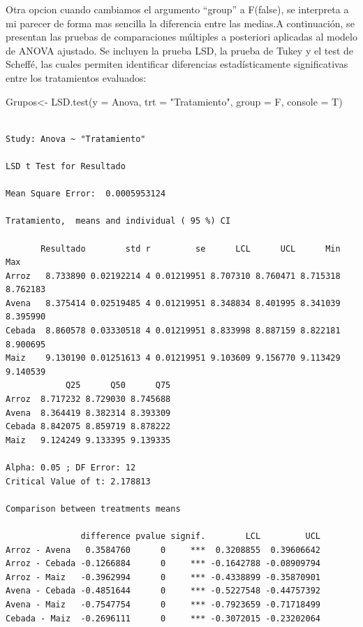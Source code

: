 \documentclass[
  spanish,
  letterpaper,
  DIV=11,
  numbers=noendperiod]{scrreprt}
\newenvironment{Shaded}{\begin{snugshade}}{\end{snugshade}}
\newcommand{\AttributeTok}[1]{\textcolor[rgb]{0.40,0.45,0.13}{#1}}
\newcommand{\FunctionTok}[1]{\textcolor[rgb]{0.28,0.35,0.67}{#1}}
\newcommand{\NormalTok}[1]{\textcolor[rgb]{0.00,0.23,0.31}{#1}}
\newcommand{\OtherTok}[1]{\textcolor[rgb]{0.00,0.23,0.31}{#1}}
\newcommand{\StringTok}[1]{\textcolor[rgb]{0.13,0.47,0.30}{#1}}
\begin{document}
Otra opcion cuando cambiamos el argumento ``group'' a F(false), se
interpreta a mi parecer de forma mas sencilla la diferencia entre las
medias.A continuación, se presentan las pruebas de comparaciones
múltiples a posteriori aplicadas al modelo de ANOVA ajustado. Se
incluyen la prueba LSD, la prueba de Tukey y el test de Scheffé, las
cuales permiten identificar diferencias estadísticamente significativas
entre los tratamientos evaluados:

\begin{Shaded}
\begin{Highlighting}[]
\NormalTok{Grupos}\OtherTok{\textless{}{-}} \FunctionTok{LSD.test}\NormalTok{(}\AttributeTok{y =}\NormalTok{ Anova, }\AttributeTok{trt =} \StringTok{"Tratamiento"}\NormalTok{, }\AttributeTok{group =}\NormalTok{ F, }\AttributeTok{console =}\NormalTok{ T)}
\end{Highlighting}
\end{Shaded}

\begin{verbatim}

Study: Anova ~ "Tratamiento"

LSD t Test for Resultado 

Mean Square Error:  0.0005953124 

Tratamiento,  means and individual ( 95 %) CI

       Resultado        std r         se      LCL      UCL      Min      Max
Arroz   8.733890 0.02192214 4 0.01219951 8.707310 8.760471 8.715318 8.762183
Avena   8.375414 0.02519485 4 0.01219951 8.348834 8.401995 8.341039 8.395990
Cebada  8.860578 0.03330518 4 0.01219951 8.833998 8.887159 8.822181 8.900695
Maiz    9.130190 0.01251613 4 0.01219951 9.103609 9.156770 9.113429 9.140539
            Q25      Q50      Q75
Arroz  8.717232 8.729030 8.745688
Avena  8.364419 8.382314 8.393309
Cebada 8.842075 8.859719 8.878222
Maiz   9.124249 9.133395 9.139335

Alpha: 0.05 ; DF Error: 12
Critical Value of t: 2.178813 

Comparison between treatments means

               difference pvalue signif.        LCL         UCL
Arroz - Avena   0.3584760      0     ***  0.3208855  0.39606642
Arroz - Cebada -0.1266884      0     *** -0.1642788 -0.08909794
Arroz - Maiz   -0.3962994      0     *** -0.4338899 -0.35870901
Avena - Cebada -0.4851644      0     *** -0.5227548 -0.44757392
Avena - Maiz   -0.7547754      0     *** -0.7923659 -0.71718499
Cebada - Maiz  -0.2696111      0     *** -0.3072015 -0.23202064
\end{verbatim}
\end{document}
